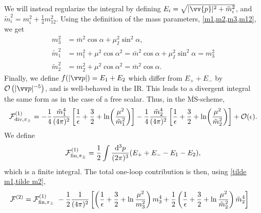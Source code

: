 We will instead regularize the integral by defining $E_i = \sqrt{|\vv{p}|^2 + \tilde m_i^2}$, and $\tilde m_i^2 = m_i^2 + \frac{1}{4} m_{12}^2$.
Using the definition of the mass parameters, \cref{m1,m2,m3,m12}, we get
\begin{align}
    m_3^2 & = \bar m^2 \cos \alpha + \mu_ I^2 \sin^2 \alpha, \\
    \label{tilde m1}
    \tilde m_1^2 
    & 
    = m_1^2 + \mu^2 \cos\alpha^2
    = \bar m^2 \cos \alpha + \mu_I^2 \sin^2 \alpha
    = m_3^2 \\
    \label{tilde m2}
    \tilde m_2^2 
    & = m_2^2 + \mu^2 \cos\alpha^2
    = \bar m^2 \cos \alpha.
\end{align}
Finally, we define $f(|\vv p|) = E_1 + E_2$ which differ from $E_+ + E_-$ by $\Oh[-5]{|\vv p|}$, and is well-behaved in the IR.
This leads to a divergent integral the same form as in the case of a free scalar.
Thus, in the $\mathrm{\overline{MS}}$-scheme, 
\begin{equation}
    \mathcal{F}^{(1)}_{\mathrm{div}, \pi_\pm }
    =
    - \frac{1}{4} \frac{\tilde m_1^4}{(4\pi)^2} 
    \left[
        \frac{1}{\epsilon} + \frac{3}{2} + \ln(\frac{\mu^2}{\tilde m_1^2}) 
    \right] 
    - \frac{1}{4} \frac{\tilde m_2^4}{(4\pi)^2} 
    \left[
        \frac{1}{\epsilon} + \frac{3}{2} + \ln(\frac{\mu^2}{\tilde m_2^2})
    \right] 
    + \mathcal{O}(\epsilon).
\end{equation}
We define
\begin{equation}
    \mathcal{F}^{(1)}_{\mathrm{fin}, \pi_\pm}
    = 
    \frac{1}{2} \int \frac{\dd^3 p}{(2\pi)^3} (E_+ + E_- - E_1 - E_2),
\end{equation}
which is a finite integral.
The total one-loop contribution is then, using \cref{tilde m1,tilde m2},
\begin{align}
    \Ef^{(2)}
    & = 
    \Ef^{(1)}_{\mathrm{fin}, \pi_\pm} 
    - \frac{1}{2}\frac{1}{(4\pi)^2}
    \left[
        \left( \frac{1}{\epsilon} + \frac{3}{2} + \ln \frac{\mu^2}{m_3^2 } \right)
        m_3^4
        +
        \frac{1}{2}
        \left( \frac{1}{\epsilon} + \frac{3}{2} + \ln \frac{\mu^2}{\tilde m_2^2} \right)
        \tilde m_2^4
    \right]
\end{align}
